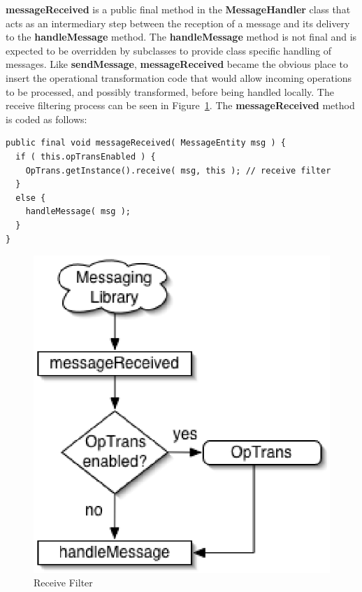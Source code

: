 \documentclass{article}
\begin{document}
\textbf{messageReceived} is a public final method in the
\textbf{MessageHandler} class
that acts as an intermediary step between the reception of a message
and its delivery to the \textbf{handleMessage} method.  The
\textbf{handleMessage}
method is not final and is expected to be overridden by subclasses to
provide class specific handling of messages.  Like \textbf{sendMessage},
\textbf{messageReceived} became the obvious place to insert the operational
transformation code that would allow incoming operations to be
processed, and possibly transformed, before being handled locally.
The receive filtering process can be seen in Figure~\ref{receive}.
The \textbf{messageReceived} method is coded as follows:

\begin{verbatim}
public final void messageReceived( MessageEntity msg ) {
  if ( this.opTransEnabled ) {
    OpTrans.getInstance().receive( msg, this ); // receive filter
  }
  else {
    handleMessage( msg );
  }
}
\end{verbatim}

\begin{figure}[!h]
\begin{center}
\includegraphics{receive.eps}
\caption{Receive Filter} \label{receive}
\end{center}
\end{figure}
\end{document}
